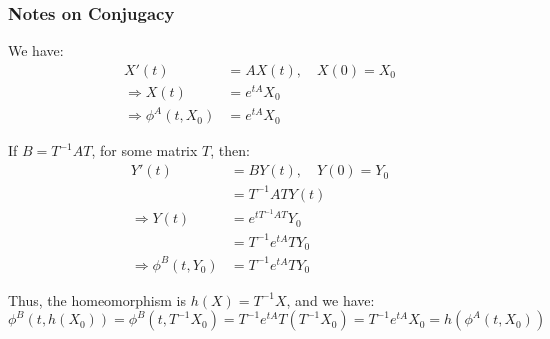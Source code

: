 \documentclass[crop=false,class=book,oneside]{standalone}
\begin{document}
        \subsubsection{Notes on Conjugacy}
            \begin{minipage}[t]{0.49\textwidth}
                We have:
                \begin{align*}
                    X'(t)&=AX(t),\quad
                    X(0)=X_{0}\\
                    \Rightarrow
                    X(t)&=e^{tA}X_{0}\\
                    \Rightarrow
                    \phi^{A}(t,X_{0})
                    &=e^{tA}X_{0}
                \end{align*}
            \end{minipage}
            \vline
            \hfill
            \begin{minipage}[t]{0.49\textwidth}
                If $B=T^{-1}AT$, for some matrix $T$, then:
                \begin{align*}
                    Y'(t)&=BY(t),\quad
                    Y(0)=Y_{0}\\
                    &=T^{-1}ATY(t)\\
                    \Rightarrow
                    Y(t)
                    &=e^{tT^{-1}AT}Y_{0}\\
                    &=T^{-1}e^{tA}TY_{0}\\
                    \Rightarrow
                    \phi^{B}(t,Y_{0})
                    &=T^{-1}e^{tA}TY_{0}
                \end{align*}
            \end{minipage}
            Thus, the homeomorphism is $h(X)=T^{-1}X$,
            and we have:
            \begin{equation*}
                \phi^{B}(t,h(X_{0}))
                =\phi^{B}(t,T^{-1}X_{0})
                =T^{-1}e^{tA}T(T^{-1}X_{0})
                =T^{-1}e^{tA}X_{0}
                =h(\phi^{A}(t,X_{0}))
            \end{equation*}
\end{document}
